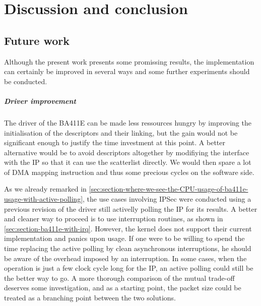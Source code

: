 \chapter{Discussion and conclusion}

\section{Future work}\label{sec:future-work}

Although the present work presents some promissing results, the implementation can certainly be improved in several ways and some further experiments should be conducted.

\paragraph{Driver improvement}
The driver of the BA411E can be made less ressources hungry by improving the initialisation of the descriptors and their linking, but the gain would not be significant enough to justify the time investment at this point.
A better alternative would be to avoid descriptors altogether by modifiying the interface with the IP so that it can use the scatterlist directly.
We would then spare a lot of DMA mapping instruction and thus some precious cycles on the software side.

As we already remarked in \ref{sec:section-where-we-see-the-CPU-usage-of-ba411e-usage-with-active-polling}, the use cases involving IPSec were conducted using a previous revision of the driver still activelly polling the IP for its results.
A better and cleaner way to proceed is to use interruption routines, as shown in \ref{sec:section-ba411e-with-irq}.
However, the kernel does not support their current implementation and panics upon usage.
If one were to be willing to spend the time replacing the active polling by clean asynchronous interruptions, he should be aware of the overhead imposed by an interruption.
In some cases, when the operation is just a few clock cycle long for the IP, an active polling could still be the better way to go.
A more thorough comparison of the mutual trade-off deserves some investigation, and as a starting point, the packet size could be treated as a branching point between the two solutions.



